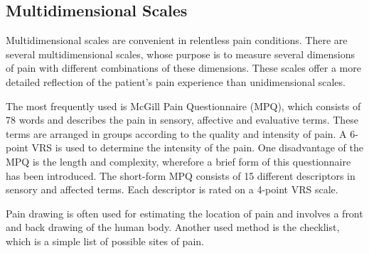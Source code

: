 \subsection{Multidimensional Scales}
Multidimensional scales are convenient in relentless pain conditions. There are several  multidimensional scales, whose purpose is to measure several dimensions of pain with different combinations of these dimensions. These scales offer a more detailed reflection of the patient's pain experience than unidimensional scales. \cite{Briggs2010} 

The most frequently used is McGill Pain Questionnaire (MPQ), which consists of 78 words and describes the pain in sensory, affective and evaluative terms. These terms are arranged in groups according to the quality and intensity of pain. A 6-point VRS is used to determine the intensity of the pain. One disadvantage of the MPQ is the length and complexity, wherefore a brief form of this questionnaire has been introduced. The short-form MPQ consists of 15 different descriptors in sensory and affected terms. Each descriptor is rated on a 4-point VRS scale.~\cite{Katz2001}


Pain drawing is often used for estimating the location of pain and involves a front and back drawing of the human body. Another used method is the checklist, which is a simple list of possible sites of pain.~\cite{Jensen2001} 



